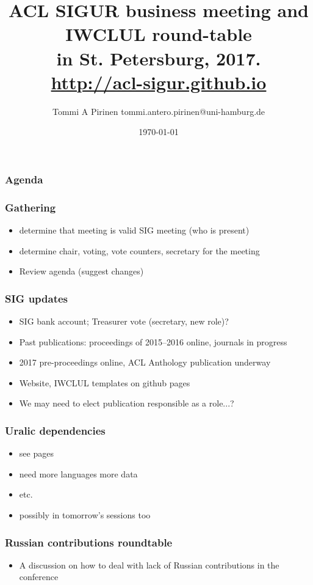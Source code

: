 \documentclass{beamer}
\title{ACL SIGUR business meeting and IWCLUL round-table\\
\scriptsize{in St. Petersburg, 2017.\\
\url{http://acl-sigur.github.io}}}
\author{Tommi A Pirinen \scriptsize \guilsinglleft
tommi.antero.pirinen@uni-hamburg.de \guilsinglright }
\institute{UHH, HZSK}
\date{\today}
\makeatletter
\newcommand\listofframes{\@starttoc{lbf}}
\makeatother
\begin{document}

\maketitle

\begin{frame}
    \frametitle{Agenda}
    \listofframes
\end{frame}

\begin{frame}
    \frametitle{Gathering}
    \begin{itemize}
        \item determine that meeting is valid SIG meeting (who is present)
        \item determine chair, voting, vote counters, secretary for the meeting
        \item Review agenda (suggest changes)
    \end{itemize}
\end{frame}

\begin{frame}
    \frametitle{SIG updates}
    \begin{itemize}
        \item SIG bank account; Treasurer vote (secretary, new role)?
        \item Past publications: proceedings of 2015--2016 online, journals
            in progress
        \item 2017 pre-proceedings online, ACL Anthology publication underway
        \item Website, IWCLUL templates on github pages
        \item We may need to elect publication responsible as a role...?
    \end{itemize}
\end{frame}

\begin{frame}
    \frametitle{Uralic dependencies}
    \begin{itemize}
        \item see pages
        \item need more languages more data
        \item etc.
        \item possibly in tomorrow's sessions too
    \end{itemize}
\end{frame}

\begin{frame}
    \frametitle{Russian contributions roundtable}
    \begin{itemize}
        \item A discussion on how to deal with lack of Russian contributions in
            the conference
    \end{itemize}
\end{frame}
\end{document}
